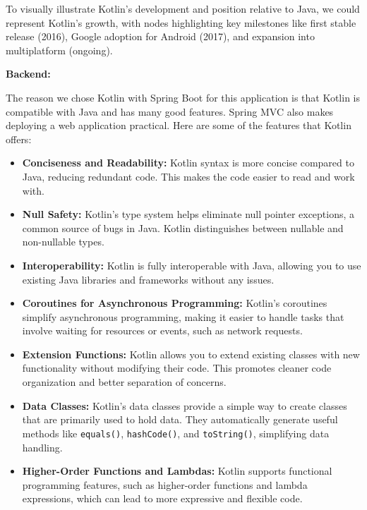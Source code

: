 To visually illustrate Kotlin’s development and position relative to Java, we could represent Kotlin’s growth, with nodes highlighting key milestones like first stable release (2016), Google adoption for Android (2017), and expansion into multiplatform (ongoing).


\textbf{Backend:}

The reason we chose Kotlin with Spring Boot for this application is that Kotlin is compatible with Java and has many good features. Spring MVC also makes deploying a web application practical. Here are some of the features that Kotlin offers:

\begin{itemize}
    \item \textbf{Conciseness and Readability:} Kotlin syntax is more concise compared to Java, reducing redundant code. This makes the code easier to read and work with.
    
    \item \textbf{Null Safety:} Kotlin's type system helps eliminate null pointer exceptions, a common source of bugs in Java. Kotlin distinguishes between nullable and non-nullable types.
    
    \item \textbf{Interoperability:} Kotlin is fully interoperable with Java, allowing you to use existing Java libraries and frameworks without any issues.
    
    \item \textbf{Coroutines for Asynchronous Programming:} Kotlin's coroutines simplify asynchronous programming, making it easier to handle tasks that involve waiting for resources or events, such as network requests.
    
    \item \textbf{Extension Functions:} Kotlin allows you to extend existing classes with new functionality without modifying their code. This promotes cleaner code organization and better separation of concerns.
    
    \item \textbf{Data Classes:} Kotlin's data classes provide a simple way to create classes that are primarily used to hold data. They automatically generate useful methods like \texttt{equals()}, \texttt{hashCode()}, and \texttt{toString()}, simplifying data handling.
    
    \item \textbf{Higher-Order Functions and Lambdas:} Kotlin supports functional programming features, such as higher-order functions and lambda expressions, which can lead to more expressive and flexible code.
\end{itemize}


